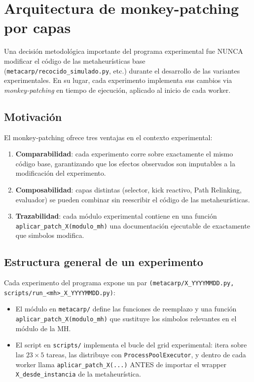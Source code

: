 \section{Arquitectura de monkey-patching por capas}
\label{sec:arquitectura-software}

Una decisión metodológica importante del programa experimental fue
NUNCA modificar el código de las metaheurísticas base
(\texttt{metacarp/recocido\_simulado.py}, etc.) durante el desarrollo
de las variantes experimentales. En su lugar, cada experimento
implementa sus cambios via \emph{monkey-patching} en tiempo de
ejecución, aplicado al inicio de cada worker.

\subsection{Motivación}

El monkey-patching ofrece tres ventajas en el contexto experimental:

\begin{enumerate}
\item \textbf{Comparabilidad}: cada experimento corre sobre exactamente
  el mismo código base, garantizando que los efectos observados son
  imputables a la modificación del experimento.
\item \textbf{Composabilidad}: capas distintas (selector, kick reactivo,
  Path Relinking, evaluador) se pueden combinar sin reescribir el
  código de las metaheurísticas.
\item \textbf{Trazabilidad}: cada módulo experimental contiene en una
  función \texttt{aplicar\_patch\_X(modulo\_mh)} una documentación
  ejecutable de exactamente que simbolos modifica.
\end{enumerate}

\subsection{Estructura general de un experimento}

Cada experimento del programa expone un par
\texttt{(metacarp/X\_YYYYMMDD.py, scripts/run\_<mh>\_X\_YYYYMMDD.py)}:

\begin{itemize}
\item El módulo en \texttt{metacarp/} define las funciones de
  reemplazo y una función \texttt{aplicar\_patch\_X(modulo\_mh)} que
  sustituye los simbolos relevantes en el módulo de la MH.
\item El script en \texttt{scripts/} implementa el bucle del grid
  experimental: itera sobre las $23 \times 5$ tareas, las distribuye
  con \texttt{ProcessPoolExecutor}, y dentro de cada worker llama
  \texttt{aplicar\_patch\_X(...)} ANTES de importar el wrapper
  \texttt{X\_desde\_instancia} de la metaheurística.
\end{itemize}

